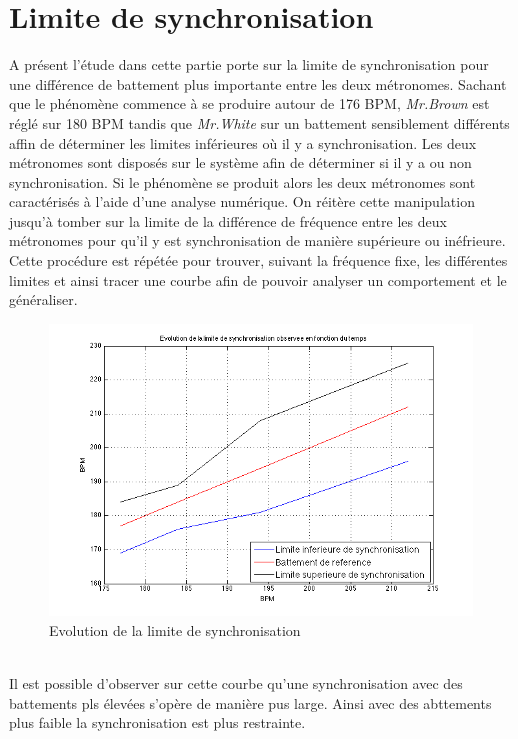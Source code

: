 \documentclass[a4paper,11pt]{report}
\begin{document}
\section{Limite de synchronisation}
A présent l'étude dans cette partie porte sur la limite de synchronisation pour une différence de battement plus importante entre les deux métronomes. Sachant que le phénomène commence à se produire autour de 176 BPM, {\it Mr.Brown} est réglé sur 180 BPM tandis que {\it Mr.White} sur un battement sensiblement différents affin de déterminer les limites inférieures où il y a synchronisation. Les deux métronomes sont disposés sur le système afin de déterminer si il y a ou non synchronisation. Si le phénomène se produit alors les deux métronomes sont caractérisés à l'aide d'une analyse numérique. On réitère cette manipulation jusqu'à tomber sur la limite de la différence de fréquence entre les deux métronomes pour qu'il y est synchronisation de manière supérieure ou inéfrieure. Cette procédure est répétée pour trouver, suivant la fréquence fixe, les différentes limites et ainsi tracer une courbe afin de pouvoir analyser un comportement et le généraliser.
\begin{figure}[h]
\centering
\includegraphics[width=1\textwidth]{CourbeLimiteSynchro}
\caption{Evolution de la limite de synchronisation}\label{Limite}
\end{figure}\\

Il est possible d'observer sur cette courbe qu'une synchronisation avec des battements pls élevées s'opère de manière pus large. Ainsi avec des abttements plus faible la synchronisation est plus restrainte.\\
\end{document}
